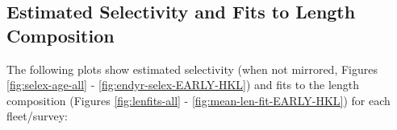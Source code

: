 \documentclass[11pt,
  english,
]{article}
\begin{document}

\hypertarget{estimated-selectivity-and-fits-to-length-composition}{%
\subsection{Estimated Selectivity and Fits to Length Composition}\label{estimated-selectivity-and-fits-to-length-composition}}

\leavevmode\tagmcend\tagstructend

The following plots show estimated selectivity (when not mirrored, Figures \ref{fig:selex-age-all} - \ref{fig:endyr-selex-EARLY-HKL}) and fits to the length composition (Figures \ref{fig:lenfits-all} - \ref{fig:mean-len-fit-EARLY-HKL}) for each fleet/survey:

\end{document}
